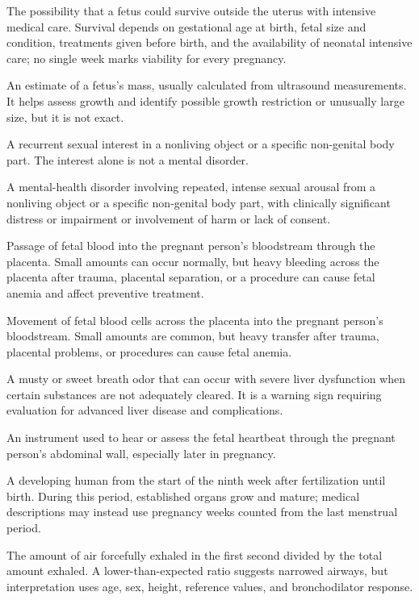  The possibility that a fetus could survive outside the uterus with intensive medical care. Survival depends on gestational age at birth, fetal size and condition, treatments given before birth, and the availability of neonatal intensive care; no single week marks viability for every pregnancy.

 An estimate of a fetus’s mass, usually calculated from ultrasound measurements. It helps assess growth and identify possible growth restriction or unusually large size, but it is not exact.

 A recurrent sexual interest in a nonliving object or a specific non-genital body part. The interest alone is not a mental disorder.

 A mental-health disorder involving repeated, intense sexual arousal from a nonliving object or a specific non-genital body part, with clinically significant distress or impairment or involvement of harm or lack of consent.

 Passage of fetal blood into the pregnant person’s bloodstream through the placenta. Small amounts can occur normally, but heavy bleeding across the placenta after trauma, placental separation, or a procedure can cause fetal anemia and affect preventive treatment.

 Movement of fetal blood cells across the placenta into the pregnant person's bloodstream. Small amounts are common, but heavy transfer after trauma, placental problems, or procedures can cause fetal anemia.

 A musty or sweet breath odor that can occur with severe liver dysfunction when certain substances are not adequately cleared. It is a warning sign requiring evaluation for advanced liver disease and complications.

 An instrument used to hear or assess the fetal heartbeat through the pregnant person's abdominal wall, especially later in pregnancy.

 A developing human from the start of the ninth week after fertilization until birth. During this period, established organs grow and mature; medical descriptions may instead use pregnancy weeks counted from the last menstrual period.

 The amount of air forcefully exhaled in the first second divided by the total amount exhaled. A lower-than-expected ratio suggests narrowed airways, but interpretation uses age, sex, height, reference values, and bronchodilator response.

